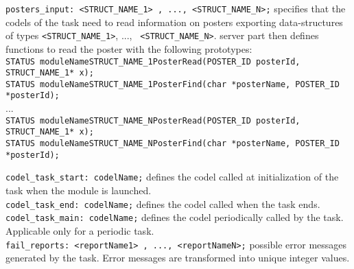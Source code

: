 \noindent
{\tt posters\_input:  <STRUCT\_NAME\_1> , ..., <STRUCT\_NAME\_N>;}
specifies that the codels of the task need to read information on posters exporting
data-structures of types {\tt <STRUCT\_NAME\_1>}, ..., {\tt
  <STRUCT\_NAME\_N>}. {\GenoM} server part then defines functions to read
the poster with the following prototypes:\\ {\small
{\tt STATUS moduleNameSTRUCT\_NAME\_1PosterRead(POSTER\_ID posterId,
  STRUCT\_NAME\_1* x);}\\
{\tt STATUS moduleNameSTRUCT\_NAME\_1PosterFind(char *posterName,
  POSTER\_ID *posterId);}\\
...\\
{\tt STATUS moduleNameSTRUCT\_NAME\_NPosterRead(POSTER\_ID posterId,
  STRUCT\_NAME\_1* x);}\\
{\tt STATUS moduleNameSTRUCT\_NAME\_NPosterFind(char *posterName,
  POSTER\_ID *posterId);}\\
}

\noindent
{\tt codel\_task\_start:  codelName;} defines the codel called at
initialization of the task when the module is launched.\\

\noindent
{\tt codel\_task\_end:  codelName;} defines the codel called when the task ends.\\

\noindent
{\tt codel\_task\_main:  codelName;} defines the codel periodically
called by the task. Applicable only for a periodic task.\\

\noindent
{\tt fail\_reports:  <reportName1> , ..., <reportNameN>;} 
possible error messages generated by the task. Error messages are
transformed into unique integer values.

